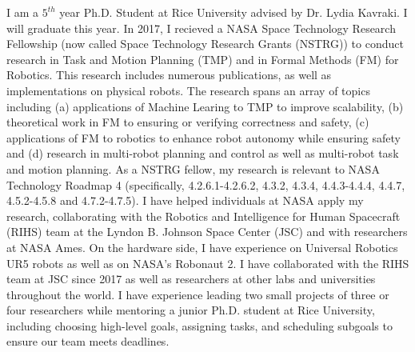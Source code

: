 
\small{I am a $5^{th}$ year Ph.D. Student at Rice University advised by Dr. Lydia Kavraki. I will graduate this year. In 2017, I recieved a NASA Space Technology Research Fellowship (now called Space Technology Research Grants (NSTRG)) to conduct research in Task and Motion Planning (TMP) and in Formal Methods (FM) for Robotics. This research includes numerous publications, as well as implementations on physical robots. The research spans an array of topics including (a) applications of Machine Learing to TMP to improve scalability, (b) theoretical work in FM to ensuring or verifying correctness and safety, (c) applications of FM to robotics to enhance robot autonomy while ensuring safety and (d) research in multi-robot planning and control as well as multi-robot task and motion planning. As a NSTRG fellow, my research is relevant to NASA Technology Roadmap 4 (specifically, 4.2.6.1-4.2.6.2, 4.3.2, 4.3.4, 4.4.3-4.4.4, 4.4.7, 4.5.2-4.5.8 and 4.7.2-4.7.5). I have helped individuals at NASA apply my research, collaborating with the Robotics and Intelligence for Human Spacecraft (RIHS) team at the Lyndon B. Johnson Space Center (JSC) and with researchers at NASA Ames. On the hardware side, I have experience on Universal Robotics UR5 robots as well as on NASA's Robonaut 2. I have collaborated with the RIHS team at JSC since 2017 as well as researchers at other labs and universities throughout the world. I have experience leading two small projects of three or four researchers while mentoring a junior Ph.D. student at Rice University, including choosing high-level goals, assigning tasks, and scheduling subgoals to ensure our team meets deadlines.}
